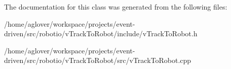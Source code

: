 The documentation for this class was generated from the following files\+:\begin{DoxyCompactItemize}
\item 
/home/aglover/workspace/projects/event-\/driven/src/robotio/v\+Track\+To\+Robot/include/v\+Track\+To\+Robot.\+h\item 
/home/aglover/workspace/projects/event-\/driven/src/robotio/v\+Track\+To\+Robot/src/v\+Track\+To\+Robot.\+cpp\end{DoxyCompactItemize}
